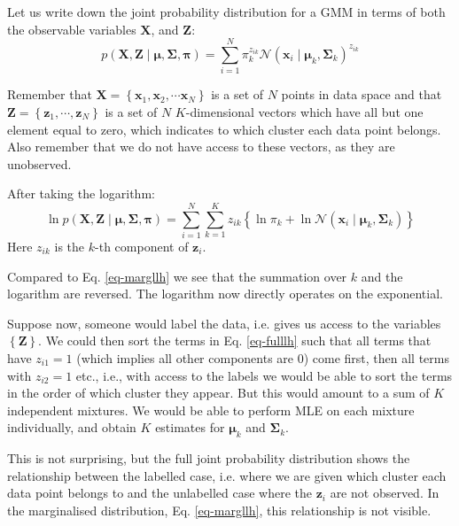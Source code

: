 Let us write down the joint probability distribution for a GMM in terms of both the observable variables $\boldsymbol{X}$, and $\boldsymbol{Z}$:
$$
p(\boldsymbol{X}, \boldsymbol{Z} \mid \boldsymbol{\mu}, \boldsymbol{\Sigma}, \boldsymbol{\pi} ) = \sum^N_{i=1} \pi^{z_{ik}}_k \mathcal{N} (\boldsymbol{x}_i \mid \boldsymbol{\mu}_k, \boldsymbol{\Sigma}_k)^{z_{ik}}
$$

Remember that $\boldsymbol{X} = \left\{ \boldsymbol{x}_1, \boldsymbol{x}_2, \cdots \boldsymbol{x}_N \right\}$ is a set of $N$ points in data space and that
$\boldsymbol{Z} = \left\{ \boldsymbol{z}_1, \cdots, \boldsymbol{z}_N \right\}$ is a set of $N$ $K$-dimensional vectors which have all but one element equal to zero, which indicates to which cluster each data point belongs. Also remember that
we do not have access to these vectors, as they are unobserved.
  

After taking the logarithm:
\begin{equation}
  \ln p(\boldsymbol{X}, \boldsymbol{Z} \mid \boldsymbol{\mu}, \boldsymbol{\Sigma}, \boldsymbol{\pi} ) = \sum^N_{i=1} \sum^K_{k=1}  z_{ik} \left\{ \ln \pi_k + \ln \mathcal{N}(\boldsymbol{x}_i \mid \boldsymbol{\mu}_k, \boldsymbol{\Sigma}_k)\right\}
  \label{eq-fulllh}
\end{equation}
Here $z_{ik}$ is the $k$-th component of $\boldsymbol{z}_i$.

Compared to Eq. \ref{eq-margllh} we see that the summation over $k$ and the logarithm are reversed. The logarithm now directly operates on the exponential.

Suppose now, someone would label the data, i.e. gives us access to the variables $\left\{ \boldsymbol{Z} \right \}$. We could then sort
the terms  in Eq. \ref{eq-fulllh} such that all terms that have $z_{i1} = 1$ (which implies all other components are 0) come first, then
all terms with $z_{i2} =1$ etc., i.e., with access to the labels we would be able to sort the terms in the order of which cluster they appear.
But this would amount to a sum of $K$ independent mixtures. We would be able to perform MLE on each mixture individually, and obtain $K$ estimates for
$\boldsymbol{\mu}_k$ and $\boldsymbol{\Sigma}_k$.

This is not surprising, but the full joint probability distribution shows the relationship between the labelled case, i.e. where we are given which cluster
each data point belongs to and the unlabelled case where the $\boldsymbol{z}_i$  are not observed. In the marginalised distribution, Eq. \ref{eq-margllh}, this
relationship is not visible.

